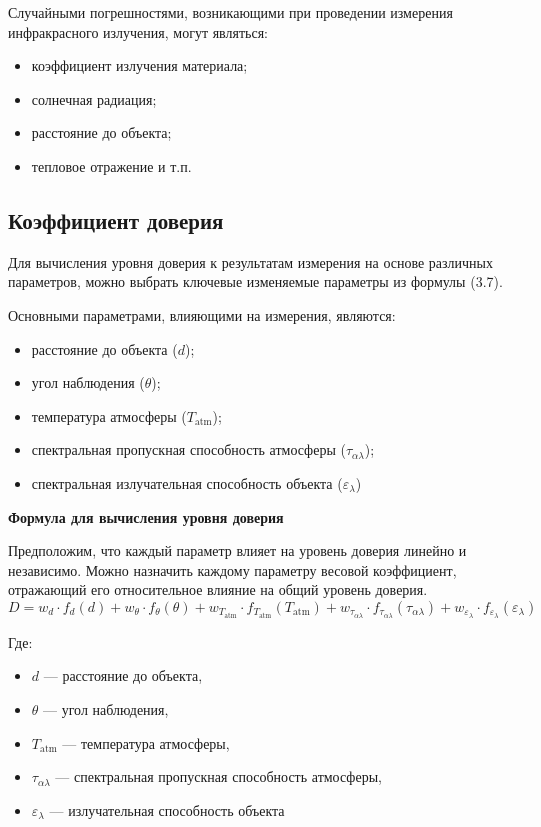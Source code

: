 Случайными погрешностями, возникающими при проведении измерения инфракрасного излучения, могут являться: 
\begin{itemize}
    \item коэффициент излучения материала;
    \item солнечная радиация;
    \item расстояние до объекта;
    \item тепловое отражение и т.п.
\end{itemize}

\subsection{Коэффициент доверия}
Для вычисления уровня доверия к результатам измерения на основе различных параметров, можно выбрать ключевые изменяемые параметры из формулы (3.7). 

Основными параметрами, влияющими на измерения, являются:

\begin{itemize}
    \item расстояние до объекта (\(d\));
    \item угол наблюдения (\(\theta\));
    \item температура атмосферы (\(T_{\text{atm}}\));
    \item спектральная пропускная способность атмосферы (\(\tau_{\alpha \lambda}\));
    \item спектральная излучательная способность объекта (\(\varepsilon_\lambda\))
\end{itemize}

\textbf{Формула для вычисления уровня доверия}

Предположим, что каждый параметр влияет на уровень доверия линейно и независимо. Можно назначить каждому параметру весовой коэффициент, отражающий его относительное влияние на общий уровень доверия.
\begin{equation}
D = w_d \cdot f_d(d) + w_\theta \cdot f_\theta(\theta) + w_{T_{\text{atm}}} \cdot f_{T_{\text{atm}}}(T_{\text{atm}}) + w_{\tau_{\alpha \lambda}} \cdot f_{\tau_{\alpha \lambda}}(\tau_{\alpha \lambda}) + w_{\varepsilon_\lambda} \cdot f_{\varepsilon_\lambda}(\varepsilon_\lambda)
\end{equation}

Где:
\begin{itemize}
    \item \(d\) — расстояние до объекта,
    \item \(\theta\) — угол наблюдения,
    \item \(T_{\text{atm}}\) — температура атмосферы,
    \item \(\tau_{\alpha \lambda}\) — спектральная пропускная способность атмосферы,
    \item \(\varepsilon_\lambda\) — излучательная способность объекта
\end{itemize}

